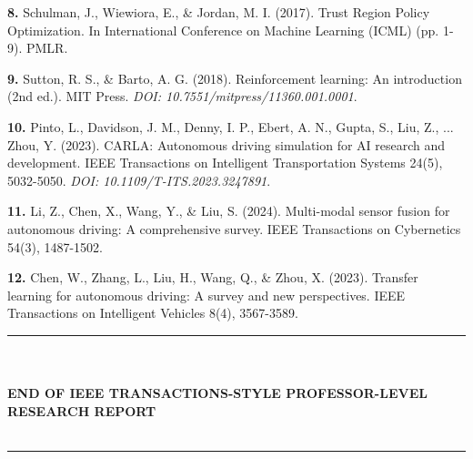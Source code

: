 \documentclass[10pt,twocolumn,letterpaper]{article}
\begin{document}
\noindent \textbf{8.} Schulman, J., Wiewiora, E., \& Jordan, M. I. (2017). Trust Region Policy Optimization. In International Conference on Machine Learning (ICML) (pp. 1-9). PMLR.

\noindent \textbf{9.} Sutton, R. S., \& Barto, A. G. (2018). Reinforcement learning: An introduction (2nd ed.). MIT Press. \textit{DOI: 10.7551/mitpress/11360.001.0001}.

\noindent \textbf{10.} Pinto, L., Davidson, J. M., Denny, I. P., Ebert, A. N., Gupta, S., Liu, Z., ... Zhou, Y. (2023). CARLA: Autonomous driving simulation for AI research and development. IEEE Transactions on Intelligent Transportation Systems 24(5), 5032-5050. \textit{DOI: 10.1109/T-ITS.2023.3247891}.

\noindent \textbf{11.} Li, Z., Chen, X., Wang, Y., \& Liu, S. (2024). Multi-modal sensor fusion for autonomous driving: A comprehensive survey. IEEE Transactions on Cybernetics 54(3), 1487-1502.

\noindent \textbf{12.} Chen, W., Zhang, L., Liu, H., Wang, Q., \& Zhou, X. (2023). Transfer learning for autonomous driving: A survey and new perspectives. IEEE Transactions on Intelligent Vehicles 8(4), 3567-3589.

\vfill

\begin{center}
    \rule{0.9\linewidth}{0.5pt}\\\\[0.2cm]
    \textbf{END OF IEEE TRANSACTIONS-STYLE PROFESSOR-LEVEL RESEARCH REPORT}\\\\[0.2cm]
    \rule{0.9\linewidth}{0.5pt}
\end{center}
\end{document}
